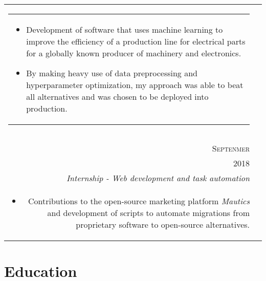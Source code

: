 \documentclass[a4paper,10pt]{article}
\begin{document}
\begin{tabularx}{\textwidth}{ r | X }
\begin{tabular}{p{}}
{\begin{itemize}[leftmargin=*]
        \item Development of software that uses machine learning to improve the
            efficiency of a production line for electrical parts for a globally
            known producer of machinery and electronics.

        \item By making heavy use of data preprocessing and hyperparameter
            optimization, my approach was able to beat all alternatives and was
            chosen to be deployed into production.

    \end{itemize}
    \vspace{-5mm}
    }
    \end{tabular} \\
  \multicolumn{2}{c}{}\\

  \begin{tabular}{r}
      \textsc{August \&} \\
      \textsc{Septenmer} \\
      \textsc{2018}
  \end{tabular} &

  \begin{tabular}{p{}}
    \textsc{Padberg \& Partners} \\
    \emph{Internship - Web development and task automation}\\
    \footnotesize{
    \vspace{-2mm}
    \begin{itemize}[leftmargin=*]

        \item Contributions to the open-source marketing platform
            \textit{Mautics} and development of scripts to automate migrations
            from proprietary software to open-source alternatives.

    \end{itemize}
    \vspace{-5mm}
  }
  \end{tabular} \\

\end{tabularx}

\section{Education}
\end{document}
